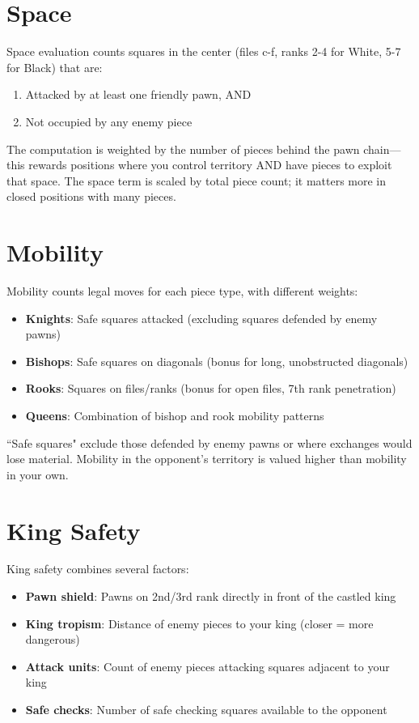 \documentclass[11pt]{book}
\begin{document}
\section{Space}

Space evaluation counts squares in the center (files c-f, ranks 2-4 for White, 5-7 for Black) that are:
\begin{enumerate}
\item Attacked by at least one friendly pawn, AND
\item Not occupied by any enemy piece
\end{enumerate}

The computation is weighted by the number of pieces behind the pawn chain---this rewards positions where you control territory AND have pieces to exploit that space. The space term is scaled by total piece count; it matters more in closed positions with many pieces.

\section{Mobility}

Mobility counts legal moves for each piece type, with different weights:
\begin{itemize}
\item \textbf{Knights}: Safe squares attacked (excluding squares defended by enemy pawns)
\item \textbf{Bishops}: Safe squares on diagonals (bonus for long, unobstructed diagonals)
\item \textbf{Rooks}: Squares on files/ranks (bonus for open files, 7th rank penetration)
\item \textbf{Queens}: Combination of bishop and rook mobility patterns
\end{itemize}

``Safe squares" exclude those defended by enemy pawns or where exchanges would lose material. Mobility in the opponent's territory is valued higher than mobility in your own.

\section{King Safety}

King safety combines several factors:
\begin{itemize}
\item \textbf{Pawn shield}: Pawns on 2nd/3rd rank directly in front of the castled king
\item \textbf{King tropism}: Distance of enemy pieces to your king (closer = more dangerous)
\item \textbf{Attack units}: Count of enemy pieces attacking squares adjacent to your king
\item \textbf{Safe checks}: Number of safe checking squares available to the opponent
\end{itemize}
\end{document}
